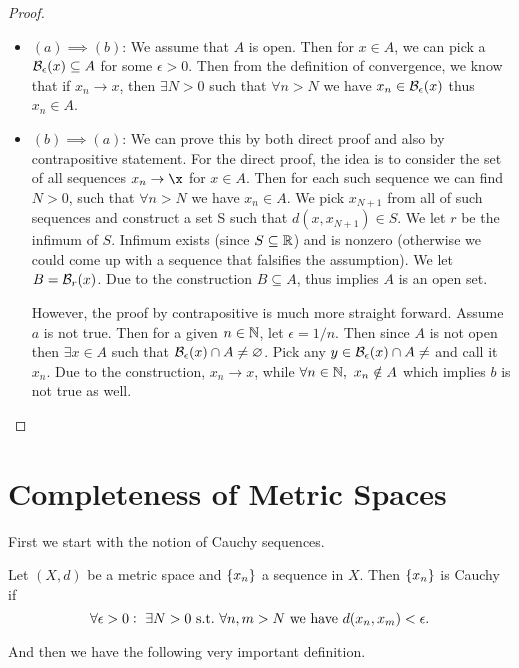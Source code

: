 \begin{proof}
	\begin{itemize}
		\item $(a) \implies (b)$: We assume that $A$ is open. Then for $x\in A$, we can pick a $\mathcal{B}_{\epsilon}(x) \subseteq A$ for some $\epsilon>0$. Then from the definition of convergence, we know that if $x_n \to x$, then $\exists N>0$ such that $\forall n>N$ we have $x_n \in \mathcal{B}_{\epsilon}(x)$ thus $x_n\in A$.
		
		\item $(b) \implies (a)$: We can prove this by both direct proof and also by contrapositive statement. For the direct proof, the idea is to consider the set of all sequences $x_n \to \x$ for $x\in A$. Then for each such sequence we can find $N>0$, such that $\forall n>N$ we have $x_n \in A$. We pick $x_{N+1}$ from all of such sequences and construct a set S such that $d(x,x_{N+1})\in S$. We let $r$ be the infimum of $S$. Infimum exists (since $S\subseteq \mathbb{R}$) and is nonzero (otherwise we could come up with a sequence that falsifies the assumption). We let $B = \mathcal{B}_{r}(x)$. Due to the construction $B \subseteq A$, thus implies $A$ is an open set. 
		
		However, the proof by contrapositive is much more straight forward. Assume $a$ is not true. Then for a given $n \in \mathbb{N}$, let $\epsilon=1/n$. Then since $A$ is not open then $\exists x\in A$ such that  $\mathcal{B}_{\epsilon}(x) \cap A \neq \varnothing$. Pick any $y \in \mathcal{B}_{\epsilon}(x) \cap A \neq$ and call it $x_n$. Due to the construction, $x_n \to x$, while $\forall n\in\mathbb{N},\ x_n\notin A$ which implies $b$ is not true as well. 
		
	\end{itemize}
\end{proof}


\section{Completeness of Metric Spaces}

First we start with the notion of Cauchy sequences.
\begin{definition}
	Let $(X,d)$ be a metric space and $\{x_n\}$ a sequence in $X$. Then $\{x_n\}$ is Cauchy if 
	\[  \forall \epsilon > 0:\ \exists N>0 \ \text{s.t.}\  \forall n,m > N \ \text{we have}\  d(x_n, x_m) < \epsilon.  \]
\end{definition}

And then we have the following very important definition.

